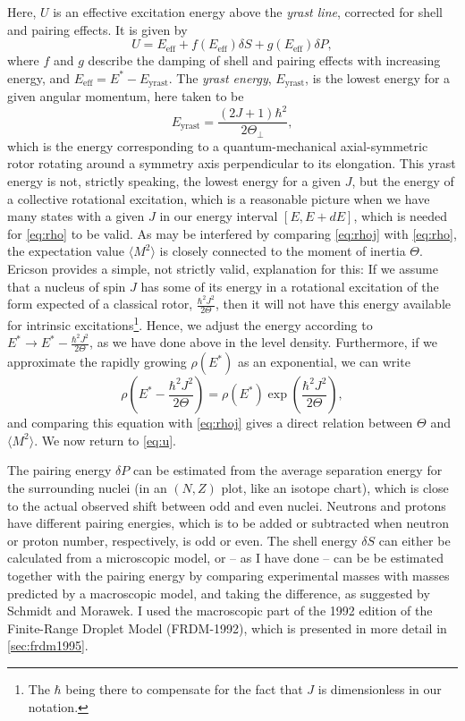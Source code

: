 Here, $U$ is an effective excitation energy above the \emph{yrast line}, corrected for shell and pairing effects. It is given by
\begin{equation}
U=E_\text{eff} + f(E_\text{eff})\delta S + g(E_\text{eff})\delta P,\label{eq:u}
\end{equation}
where $f$ and $g$ describe the damping of shell and pairing effects with increasing energy, and $E_\text{eff} = E^*-E_\text{yrast}$. The \emph{yrast energy}, $E_\text{yrast}$, is the lowest energy for a given angular momentum, here taken to be
\begin{equation}
E_\text{yrast} = \frac{(2J+1)\hbar^2}{2\Theta_\perp},
\end{equation}
which is the energy corresponding to a quantum-mechanical axial-symmetric rotor rotating around a symmetry axis perpendicular to its elongation. This yrast energy is not, strictly speaking, the lowest energy for a given $J$, but the energy of a collective rotational excitation\cite{ericson:1960}, which is a reasonable picture when we have many states with a given $J$ in our energy interval $[E,E+dE]$, which is needed for \eqref{eq:rho} to be valid. 
As may be interfered by comparing \eqref{eq:rhoj} with \eqref{eq:rho}, the expectation value $\langle M^2 \rangle$ is closely connected to the moment of inertia $\Theta$.
Ericson\cite{ericson:1960} provides a simple, not strictly valid, explanation for this:
If we assume that a nucleus of spin $J$ has some of its energy in a rotational excitation of the form expected of a classical rotor, $\frac{\hbar^2J^2}{2\Theta}$, then it will not have this energy available for intrinsic excitations\footnote{The $\hbar$ being there to compensate for the fact that $J$ is dimensionless in our notation.}. Hence, we adjust the energy according to $E^* \to E^* - \frac{\hbar^2J^2}{2\Theta}$, as we have done above in the level density. Furthermore, if we approximate the rapidly growing $\rho(E^*)$ as an exponential, we can write
\begin{equation}
\rho(E^* - \frac{\hbar^2J^2}{2\Theta}) = \rho(E^*) \exp{(\frac{\hbar^2J^2}{2\Theta})},
\end{equation}
and comparing this equation with \eqref{eq:rhoj} gives a direct relation between $\Theta$ and $\langle M^2 \rangle$. We now return to \autoref{eq:u}.

The pairing energy $\delta P$ can be estimated from the average separation energy for the surrounding nuclei (in an $(N,Z)$ plot, like an isotope chart), which is close to the actual observed shift between odd and even nuclei\cite{ericson:1960}. Neutrons and protons have different pairing energies, which is to be added or subtracted when neutron or proton number, respectively, is odd or even. 
The shell energy $\delta S$ can either be calculated from a microscopic model, or -- as I have done -- can be be estimated together with the pairing energy by comparing experimental masses with masses predicted by a macroscopic model, and taking the difference, as suggested by Schmidt and Morawek\cite{schmidt:1991:art}. I used the macroscopic part of the 1992 edition of the Finite-Range Droplet Model (FRDM-1992)\cite{moller1995}, which is presented in more detail in \autoref{sec:frdm1995}.

